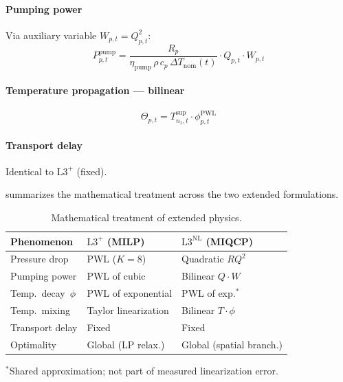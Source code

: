 \documentclass[review,3p]{elsarticle}
\newcommand{\Lplus}{\mathrm{L3}^{+}}
\newcommand{\Lnl}{\mathrm{L3}^{\mathrm{NL}}}
\begin{document}
\paragraph{Pumping power}
Via auxiliary variable $W_{p,t} = Q_{p,t}^2$:
\begin{equation}
  P_{p,t}^{\mathrm{pump}} =
    \frac{R_p}{\eta_{\mathrm{pump}}\, \rho\, c_p\,
      \Delta T_{\mathrm{nom}}(t)}
    \cdot Q_{p,t} \cdot W_{p,t}
  \label{eq:pump_bilinear}
\end{equation}

\paragraph{Temperature propagation --- bilinear}
\begin{equation}
  \Theta_{p,t} = T_{n_1,t}^{\mathrm{sup}}
    \cdot \phi_{p,t}^{\mathrm{PWL}}
  \label{eq:bilinear_temp}
\end{equation}

\paragraph{Transport delay}
Identical to $\Lplus$ (fixed).

 summarizes the mathematical treatment across
the two extended formulations.

\begin{table}[htbp]
\centering
\caption{Mathematical treatment of extended physics.}
\label{tab:lplus_vs_lnl}
\small
\begin{tabular}{@{} l l l @{}}
\toprule
Phenomenon & $\Lplus$ (MILP) & $\Lnl$ (MIQCP) \\
\midrule
Pressure drop   & PWL ($K{=}8$)       & Quadratic $RQ^2$ \\
Pumping power   & PWL of cubic        & Bilinear $Q \cdot W$ \\
Temp.\ decay~$\phi$ & PWL of exponential & PWL of exp.$^{*}$ \\
Temp.\ mixing   & Taylor linearization & Bilinear $T \cdot \phi$ \\
Transport delay & Fixed               & Fixed \\
\midrule
Optimality      & Global (LP relax.)  & Global (spatial branch.) \\
\bottomrule
\end{tabular}

\vspace{2pt}
\raggedright\footnotesize
$^{*}$Shared approximation; not part of measured linearization error.
\end{table}
\end{document}
